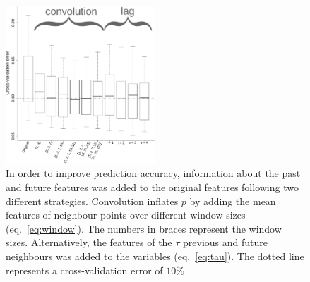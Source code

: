 \begin{figure}[h!]
  \centering    
    \includegraphics[width=0.5\textwidth]{figures/temporal_integration.pdf}
  \caption{
  In order to improve prediction accuracy, information about the past and future features was added to the original features following two different strategies.
  Convolution inflates $p$ by adding the mean features of neighbour points over different window sizes (eq.~\ref{eq:window}).
  The numbers in braces represent the window sizes.
  Alternatively, the features of the $\tau$ previous and future neighbours was added to the variables (eq.~\ref{eq:tau}).
  The dotted line represents a cross-validation error of $10\%$
  \label{fig:temporal_integration}
  }
\end{figure}
